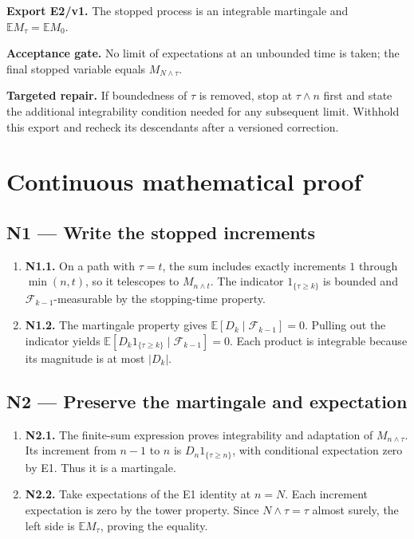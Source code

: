 \documentclass[preprint,12pt,aps,pra,showkeys,amsmath,amssymb,superscriptaddress,floatfix]{revtex4-2}
\theoremstyle{definition}
\theoremstyle{remark}
\newcommand{\field}[2]{\par\smallskip\noindent\textbf{#1.} #2\par}
\begin{document}
\field{Export E2/v1}{The stopped process is an integrable martingale and
\(\mathbb EM_\tau=\mathbb EM_0\).}

\field{Acceptance gate}{No limit of expectations at an unbounded time is taken; the final
stopped variable equals \(M_{N\wedge\tau}\).}

\field{Targeted repair}{If boundedness of \(\tau\) is removed, stop at \(\tau\wedge n\) first
and state the additional integrability condition needed for any
subsequent limit. Withhold this export and recheck its descendants after
a versioned correction.}

\endgroup\clearpage\section{Continuous mathematical proof}\label{sec:proof}

\subsection{N1 --- Write the stopped
increments}\label{n1-write-the-stopped-increments}

\begin{enumerate}
\def\labelenumi{\arabic{enumi}.}
\item
  \textbf{N1.1.} On a path with \(\tau=t\), the sum includes exactly
  increments \(1\) through \(\min(n,t)\), so it telescopes to
  \(M_{n\wedge t}\). The indicator \(1_{\{\tau\ge k\}}\) is bounded and
  \(\mathcal F_{k-1}\)-measurable by the stopping-time property.
\item
  \textbf{N1.2.} The martingale property gives
  \(\mathbb E[D_k\mid\mathcal F_{k-1}]=0\). Pulling out the indicator
  yields \(\mathbb E[D_k1_{\{\tau\ge k\}}\mid\mathcal F_{k-1}]=0\). Each
  product is integrable because its magnitude is at most \(|D_k|\).
\end{enumerate}

\subsection{N2 --- Preserve the martingale and
expectation}\label{n2-preserve-the-martingale-and-expectation}

\begin{enumerate}
\def\labelenumi{\arabic{enumi}.}
\item
  \textbf{N2.1.} The finite-sum expression proves integrability and
  adaptation of \(M_{n\wedge\tau}\). Its increment from \(n-1\) to \(n\)
  is \(D_n1_{\{\tau\ge n\}}\), with conditional expectation zero by E1.
  Thus it is a martingale.
\item
  \textbf{N2.2.} Take expectations of the E1 identity at \(n=N\). Each
  increment expectation is zero by the tower property. Since
  \(N\wedge\tau=\tau\) almost surely, the left side is
  \(\mathbb EM_\tau\), proving the equality.
\end{enumerate}
\end{document}
